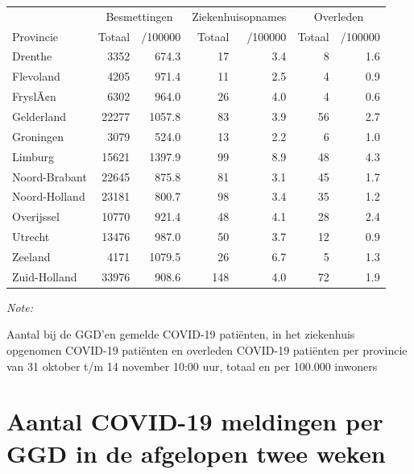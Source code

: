 \documentclass[
  english,
  man,floatsintext]{apa6}
\begin{document}
\begin{table}
\centering
\begin{threeparttable}
\begin{tabular}{lrrrrrr}
\toprule
\multicolumn{1}{c}{ } & \multicolumn{2}{c}{Besmettingen} & \multicolumn{2}{c}{Ziekenhuisopnames} & \multicolumn{2}{c}{Overleden} \\
\cmidrule(l{3pt}r{3pt}){2-3} \cmidrule(l{3pt}r{3pt}){4-5} \cmidrule(l{3pt}r{3pt}){6-7}
Provincie & Totaal & /100000 & Totaal & /100000 & Totaal & /100000\\
\midrule
Drenthe & 3352 & 674.3 & 17 & 3.4 & 8 & 1.6\\
Flevoland & 4205 & 971.4 & 11 & 2.5 & 4 & 0.9\\
FryslÃ¢n & 6302 & 964.0 & 26 & 4.0 & 4 & 0.6\\
Gelderland & 22277 & 1057.8 & 83 & 3.9 & 56 & 2.7\\
Groningen & 3079 & 524.0 & 13 & 2.2 & 6 & 1.0\\
Limburg & 15621 & 1397.9 & 99 & 8.9 & 48 & 4.3\\
Noord-Brabant & 22645 & 875.8 & 81 & 3.1 & 45 & 1.7\\
Noord-Holland & 23181 & 800.7 & 98 & 3.4 & 35 & 1.2\\
Overijssel & 10770 & 921.4 & 48 & 4.1 & 28 & 2.4\\
Utrecht & 13476 & 987.0 & 50 & 3.7 & 12 & 0.9\\
Zeeland & 4171 & 1079.5 & 26 & 6.7 & 5 & 1.3\\
Zuid-Holland & 33976 & 908.6 & 148 & 4.0 & 72 & 1.9\\
\bottomrule
\end{tabular}
\begin{tablenotes}
\item \textit{Note: } 
\item Aantal bij de GGD’en gemelde COVID-19 patiënten, in het ziekenhuis opgenomen COVID-19 patiënten en overleden COVID-19 patiënten per provincie van 31 oktober t/m 14 november 10:00 uur, totaal en per 100.000 inwoners
\end{tablenotes}
\end{threeparttable}
\end{table}

\newpage

\hypertarget{aantal-covid-19-meldingen-per-ggd-in-de-afgelopen-twee-weken}{%
\section{Aantal COVID-19 meldingen per GGD in de afgelopen twee weken}\label{aantal-covid-19-meldingen-per-ggd-in-de-afgelopen-twee-weken}}
\end{document}
